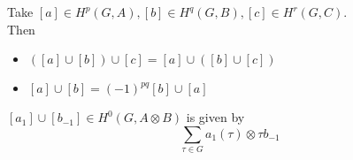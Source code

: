 \documentclass[../main.tex]{subfiles}
\begin{document}
\begin{thm}
	Take $ [ a] \in H^{p}( G,A) , [ b] \in H^{q}( G,B) , [ c] \in H^{r}( G,C)  $.\\
	Then
	\begin{itemize}
	\item $ ( [ a] \cup [ b] ) \cup [ c] = [ a] \cup ( [ b] \cup [ c] ) $ 
	\item $ [ a] \cup [ b] = ( -1)^{pq} [ b] \cup [ a] $ 
	\end{itemize}
\end{thm}
\begin{lemma}
	$[a_1] \cup [ b_{-1} ] \in H^{0}( G, A\otimes B) $ is given by
	\[ 
	\sum_{\tau \in G} a_1( \tau) \otimes \tau b_{-1} 
	\]
	
\end{lemma}
\end{document}
